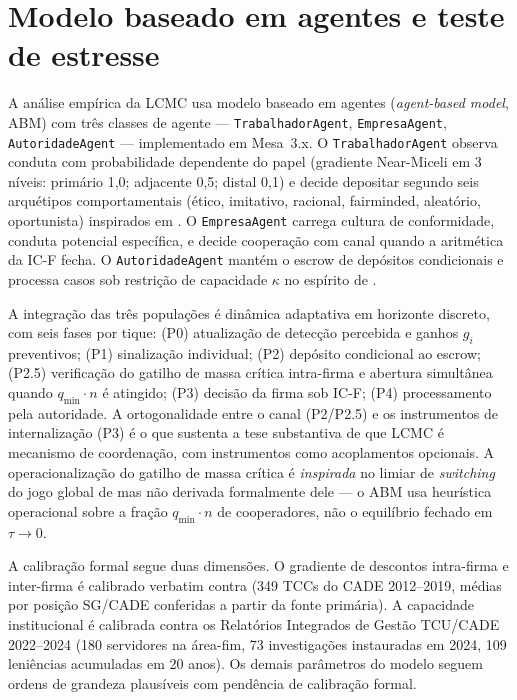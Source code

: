 \documentclass[12pt,a4paper]{article}
\begin{document}
\section{Modelo baseado em agentes e teste de estresse}
\label{sec:limitacoes}

A análise empírica da LCMC usa modelo baseado em agentes (\emph{agent-based
model}, ABM) com três classes de agente --- \texttt{TrabalhadorAgent},
\texttt{EmpresaAgent}, \texttt{AutoridadeAgent} --- implementado em Mesa~3.x.
O \texttt{TrabalhadorAgent} observa conduta com probabilidade dependente do
papel (gradiente Near-Miceli em 3 níveis: primário 1,0; adjacente 0,5;
distal 0,1) e decide depositar segundo seis arquétipos comportamentais
(ético, imitativo, racional, fairminded, aleatório, oportunista) inspirados
em \citet{hokamp2010income}. O \texttt{EmpresaAgent} carrega cultura de
conformidade, conduta potencial específica, e decide cooperação com canal
quando a aritmética da IC-F\* fecha. O \texttt{AutoridadeAgent} mantém o
escrow de depósitos condicionais e processa casos sob restrição de
capacidade $\kappa$ no espírito de \citet{harrington2015when}.

A integração das três populações é dinâmica adaptativa em horizonte
discreto, com seis fases por tique: (P0) atualização de detecção percebida
e ganhos $g_i$ preventivos; (P1) sinalização individual; (P2) depósito
condicional ao escrow; (P2.5) verificação do gatilho de massa crítica
intra-firma e abertura simultânea quando $q_{\min}\cdot n$ é atingido; (P3)
decisão da firma sob IC-F\*; (P4) processamento pela autoridade. A
ortogonalidade entre o canal (P2/P2.5) e os instrumentos de internalização
(P3) é o que sustenta a tese substantiva de que LCMC é mecanismo de
coordenação, com instrumentos como acoplamentos opcionais. A
operacionalização do gatilho de massa crítica é \emph{inspirada} no
limiar de \emph{switching} do jogo global de \citet{morris1998unique} mas
não derivada formalmente dele --- o ABM usa heurística operacional sobre
a fração $q_{\min}\cdot n$ de cooperadores, não o equilíbrio fechado em
$\tau\to 0$.

A calibração formal segue duas dimensões. O gradiente de descontos
intra-firma e inter-firma é calibrado verbatim contra \citet{saito2021tcc}
(349 TCCs do CADE 2012--2019, médias por posição SG/CADE conferidas a partir
da fonte primária). A capacidade institucional é calibrada contra os
Relatórios Integrados de Gestão TCU/CADE 2022--2024 (180 servidores na
área-fim, 73 investigações instauradas em 2024, 109 leniências acumuladas em
20 anos). Os demais parâmetros do modelo seguem ordens de grandeza
plausíveis com pendência de calibração formal.
\end{document}
